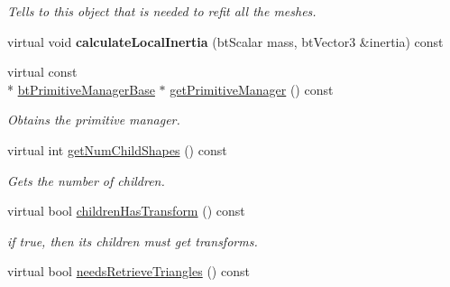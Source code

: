 \begin{DoxyCompactItemize}
\begin{DoxyCompactList}\small\item\em Tells to this object that is needed to refit all the meshes. \end{DoxyCompactList}\item 
\hypertarget{classbt_g_impact_mesh_shape_a060dafd36f1bb428d5130ca5cf137d1d}{virtual void {\bfseries calculate\+Local\+Inertia} (bt\+Scalar mass, bt\+Vector3 \&inertia) const }\label{classbt_g_impact_mesh_shape_a060dafd36f1bb428d5130ca5cf137d1d}

\item 
\hypertarget{classbt_g_impact_mesh_shape_aaf65a0a643eab8dce1b2f0a89880bcd7}{virtual const \\*
\hyperlink{classbt_primitive_manager_base}{bt\+Primitive\+Manager\+Base} $\ast$ \hyperlink{classbt_g_impact_mesh_shape_aaf65a0a643eab8dce1b2f0a89880bcd7}{get\+Primitive\+Manager} () const }\label{classbt_g_impact_mesh_shape_aaf65a0a643eab8dce1b2f0a89880bcd7}

\begin{DoxyCompactList}\small\item\em Obtains the primitive manager. \end{DoxyCompactList}\item 
\hypertarget{classbt_g_impact_mesh_shape_aec0f4ed6bed09ef67349eed0a05921c1}{virtual int \hyperlink{classbt_g_impact_mesh_shape_aec0f4ed6bed09ef67349eed0a05921c1}{get\+Num\+Child\+Shapes} () const }\label{classbt_g_impact_mesh_shape_aec0f4ed6bed09ef67349eed0a05921c1}

\begin{DoxyCompactList}\small\item\em Gets the number of children. \end{DoxyCompactList}\item 
\hypertarget{classbt_g_impact_mesh_shape_a5693f6e8b6288091ed4bfd445fed1f3e}{virtual bool \hyperlink{classbt_g_impact_mesh_shape_a5693f6e8b6288091ed4bfd445fed1f3e}{children\+Has\+Transform} () const }\label{classbt_g_impact_mesh_shape_a5693f6e8b6288091ed4bfd445fed1f3e}

\begin{DoxyCompactList}\small\item\em if true, then its children must get transforms. \end{DoxyCompactList}\item 
\hypertarget{classbt_g_impact_mesh_shape_a946835fca3b128e784ae150a4a4d3abd}{virtual bool \hyperlink{classbt_g_impact_mesh_shape_a946835fca3b128e784ae150a4a4d3abd}{needs\+Retrieve\+Triangles} () const }\label{classbt_g_impact_mesh_shape_a946835fca3b128e784ae150a4a4d3abd}


\end{DoxyCompactItemize}
